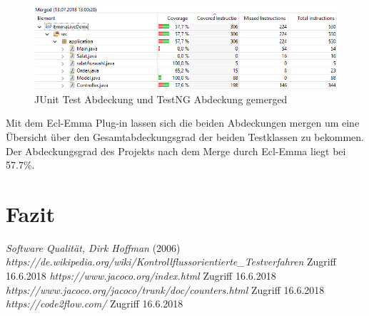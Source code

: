 \documentclass[a4paper]{article}
\begin{document}
\begin{figure}[h]
\includegraphics[scale=0.6]{Merged_Abdeckung.png}
\caption{JUnit Test Abdeckung und TestNG Abdeckung gemerged}
\centering
\end{figure}
Mit dem Ecl-Emma Plug-in lassen sich die beiden Abdeckungen mergen um eine Übersicht über den Gesamtabdeckungsgrad der beiden Testklassen zu bekommen. Der Abdeckungsgrad des Projekts nach dem Merge durch Ecl-Emma liegt bei 57.7\%. 
\section{Fazit}
\begin{thebibliography}{1}
	 \emph{Software Qualität, Dirk Hoffman} (2006)
	 \emph{https://de.wikipedia.org/wiki/Kontrollflussorientierte\_Testverfahren} Zugriff 16.6.2018
	 \emph{https://www.jacoco.org/index.html} Zugriff 16.6.2018
	 \emph{https://www.jacoco.org/jacoco/trunk/doc/counters.html} Zugriff 16.6.2018
	 \emph{https://code2flow.com/} Zugriff 16.6.2018
\end{thebibliography}
\end{document}
